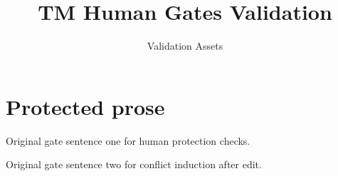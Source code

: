 \documentclass[11pt]{article}
\title{TM Human Gates Validation}
\author{Validation Assets}
\date{}
\begin{document}
\maketitle

\section{Protected prose}
\label{sec:gates}

Original gate sentence one for human protection checks.

Original gate sentence two for conflict induction after edit.
\end{document}
